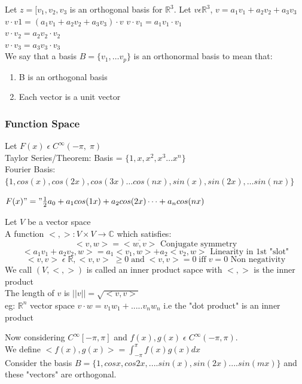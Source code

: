 \documentclass[11pt]{article}
\theoremstyle{definition}
\newcommand{\C}{\mathbb{C}}
\newcommand{\R}{\mathbb{R}}
\begin{document}
Let $z = [v_1, v_2, v_3$ is an orthogonal basis for $\R^3$. Let $v \epsilon \R^3$, $v = a_1v_1 + a_2v_2 + a_3v_3$\\
$v \cdot v1 = (a_1v_1 + a_2v_2 + a_3v_3)\cdot v$
$v\cdot v_1 = a_1v_1\cdot v_1$\\
$v \cdot v_2 = a_2v_2\cdot v_2$\\
$v \cdot v_3 = a_3v_3\cdot v_3$\\

We say that a basis $B = \{v_1, \dots v_p\}$ is an orthonormal basis to mean that:
\begin{enumerate}[topsep=-10pt,itemsep=-5pt]
    \item B is an orthogonal basis
    \item Each vector is a unit vector
\end{enumerate}

\subsubsection{Function Space}
Let $F(x)\; \epsilon\; C^\infty(-\pi,\; \pi)$\\
Taylor Series/Theorem: Basis = $\{1,x,x^2,x^3\dots x^n\}$\\
Fourier Basis: $\{1, cos(x), cos(2x), cos(3x) \dots cos(nx), sin(x), sin(2x), \dots sin(nx)\}$

$F(x) "=" \frac{1}{2}a_0 + a_1cos(1x) + a_2cos(2x) \dots + a_ncos(nx)$

Let $V$ be a vector space\\
A function $<, >: V \times V \rightarrow \C$ which satisfies:
$$<v,w> = \overline{<w,v>} \text{        Conjugate symmetry}$$
$$<a_1v_1 + a_2v_2,w> = a_1<v_1,w> + a_2<v_2,w> \text{        Linearity in 1st "slot"}$$
$$<v,v>\; \epsilon\; \R, <v,v>\; \geq 0\; \text{and}\; <v,v> = 0 \;\text{iff}\; v = 0  \text{        Non negativity}$$
We call $(V, <,>)$ is called an inner product sapce with $<,>$ is the inner product\\
The length of $v$ is $||v|| = \sqrt{<v,v>}$\\
eg: $\R^n$ vector space $v\cdot w = v_1w_1 + .....v_nw_n$ i.e the "dot product" is an inner product

Now considering $C^\infty [-\pi, \pi]$ and $f(x), g(x) \; \epsilon \; C^\infty (-\pi, \pi)$.\\ We define $<f(x), g(x)> = \int^\pi_{-\pi}f(x)g(x)dx$\\

Consider the basis $B = \{1, cosx, cos2x,....sin(x), sin(2x)....sin(mx)\}$ and these "vectors" are orthogonal.
\end{document}
